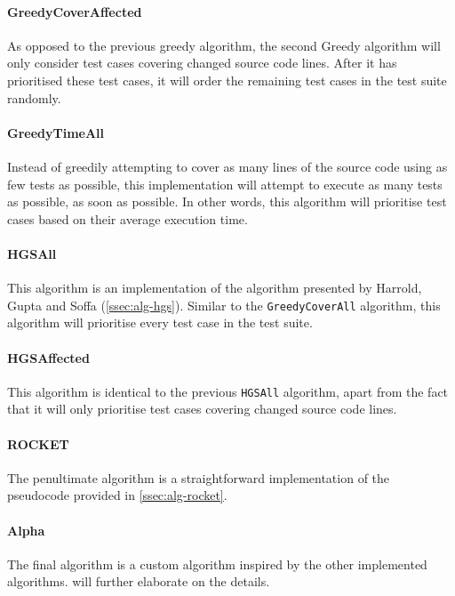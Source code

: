 \paragraph*{GreedyCoverAffected} As opposed to the previous greedy algorithm, the second Greedy algorithm will only consider test cases covering changed source code lines. After it has prioritised these test cases, it will order the remaining test cases in the test suite randomly.

\paragraph*{GreedyTimeAll} Instead of greedily attempting to cover as many lines of the source code using as few tests as possible, this implementation will attempt to execute as many tests as possible, as soon as possible. In other words, this algorithm will prioritise test cases based on their average execution time.

\paragraph*{HGSAll} This algorithm is an implementation of the algorithm presented by Harrold, Gupta and Soffa (\cref{ssec:alg-hgs}). Similar to the \texttt{GreedyCoverAll} algorithm, this algorithm will prioritise every test case in the test suite.

\paragraph*{HGSAffected} This algorithm is identical to the previous \texttt{HGSAll} algorithm, apart from the fact that it will only prioritise test cases covering changed source code lines.

\paragraph*{ROCKET} The penultimate algorithm is a straightforward implementation of the pseudocode provided in \cref{ssec:alg-rocket}.

\paragraph*{Alpha} The final algorithm is a custom algorithm inspired by the other implemented algorithms.  will further elaborate on the details.\\

